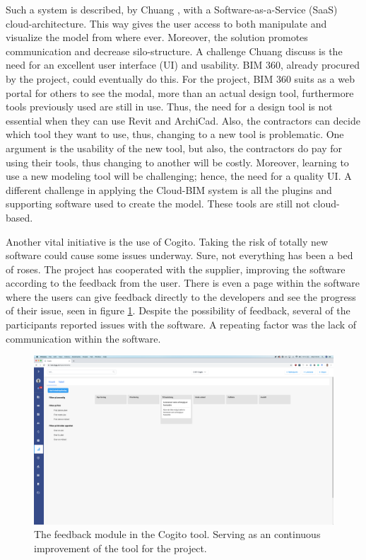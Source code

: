 Such a system is described, by Chuang \cite{chuang2011applying}, with a Software-as-a-Service (SaaS) cloud-architecture. This way gives the user access to both manipulate and visualize the model from where ever. Moreover, the solution promotes communication and decrease silo-structure. A challenge Chuang discuss is the need for an excellent user interface (UI) and usability. BIM 360, already procured by the project, could eventually do this. For the project, BIM 360 suits as a web portal for others to see the modal, more than an actual design tool, furthermore tools previously used are still in use. Thus, the need for a design tool is not essential when they can use Revit and ArchiCad. Also, the contractors can decide which tool they want to use, thus, changing to a new tool is problematic. One argument is the usability of the new tool, but also, the contractors do pay for using their tools, thus changing to another will be costly. Moreover, learning to use a new modeling tool will be challenging; hence, the need for a quality UI. A different challenge in applying the Cloud-BIM system is all the plugins and supporting software used to create the model. These tools are still not cloud-based.

Another vital initiative is the use of Cogito. Taking the risk of totally new software could cause some issues underway. Sure, not everything has been a bed of roses. The project has cooperated with the supplier, improving the software according to the feedback from the user. There is even a page within the software where the users can give feedback directly to the developers and see the progress of their issue, seen in figure \ref{fig:cogito_feedback}. Despite the possibility of feedback, several of the participants reported issues with the software. A repeating factor was the lack of communication within the software. 

\begin{figure}
    \centering
    \includegraphics[width=\textwidth]{fig/cogitos_feedback.png}
    \caption{The feedback module in the Cogito tool. Serving as an continuous improvement of the tool for the project.}
    \label{fig:cogito_feedback}
\end{figure}

